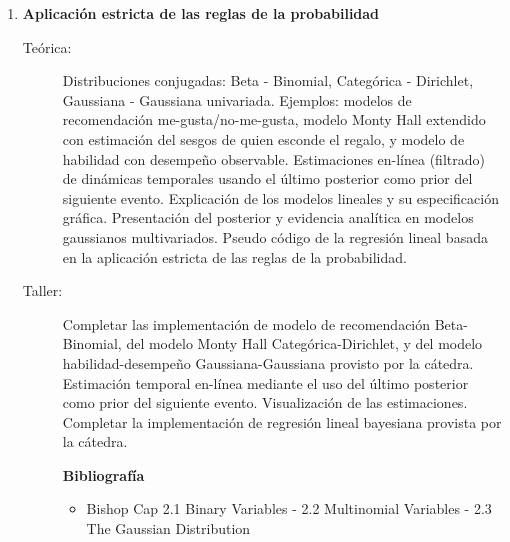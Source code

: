 \documentclass[11pt]{article}
\begin{document}
\begin{enumerate}
\item \textbf{Aplicación estricta de las reglas de la probabilidad}
\vspace{-0.15cm}
\begin{description}
\item[Teórica:] Distribuciones conjugadas: Beta - Binomial, Categórica - Dirichlet, Gaussiana - Gaussiana univariada.
Ejemplos: modelos de recomendación me-gusta/no-me-gusta, modelo Monty Hall extendido con estimación del sesgos de quien esconde el regalo, y modelo de habilidad con desempeño observable.
Estimaciones en-línea (filtrado) de dinámicas temporales usando el último posterior como prior del siguiente evento.
Explicación de los modelos lineales y su especificación gráfica.
Presentación del posterior y evidencia analítica en modelos gaussianos multivariados.
Pseudo código de la regresión lineal basada en la aplicación estricta de las reglas de la probabilidad.
\item[Taller:] Completar las implementación de modelo de recomendación Beta-Binomial, del modelo Monty Hall Categórica-Dirichlet, y del modelo habilidad-desempeño Gaussiana-Gaussiana provisto por la cátedra.
Estimación temporal en-línea mediante el uso del último posterior como prior del siguiente evento.
Visualización de las estimaciones.
Completar la implementación de regresión lineal bayesiana provista por la cátedra.
\item[] \textbf{Bibliografía}
\begin{itemize}
\item Bishop \cite{bishop2006-PRML} Cap 2.1 Binary Variables - 2.2 Multinomial Variables - 2.3 The Gaussian Distribution
\end{itemize}
\end{description}



\end{enumerate}
\end{document}
